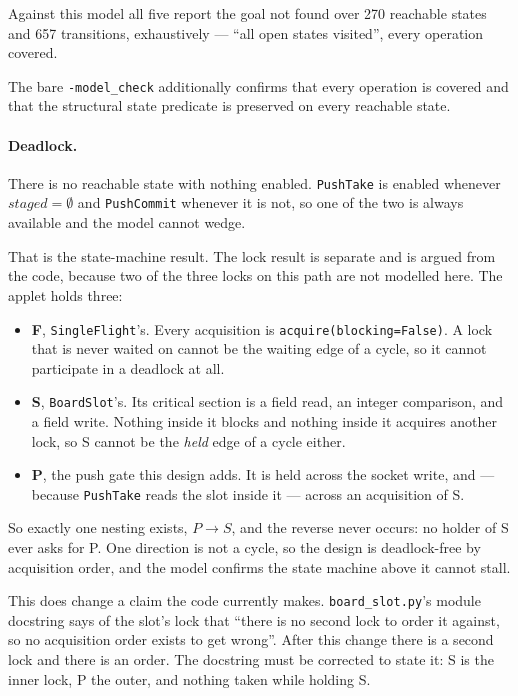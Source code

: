 \documentclass[a4paper,10pt,fleqn]{article}
\begin{document}
Against this model all five report the goal not found over 270 reachable states
and 657 transitions, exhaustively --- ``all open states visited'', every
operation covered.

The bare \texttt{-model\_check} additionally confirms that every operation is
covered and that the structural state predicate is preserved on every reachable
state.

\paragraph{Deadlock.}
There is no reachable state with nothing enabled. \texttt{PushTake} is enabled
whenever $staged = \emptyset$ and \texttt{PushCommit} whenever it is not, so one
of the two is always available and the model cannot wedge.

That is the state-machine result. The lock result is separate and is argued from
the code, because two of the three locks on this path are not modelled here. The
applet holds three:

\begin{itemize}
  \item \textbf{F}, \texttt{SingleFlight}'s. Every acquisition is
    \texttt{acquire(blocking=False)}. A lock that is never waited on cannot be
    the waiting edge of a cycle, so it cannot participate in a deadlock at all.
  \item \textbf{S}, \texttt{BoardSlot}'s. Its critical section is a field read,
    an integer comparison, and a field write. Nothing inside it blocks and
    nothing inside it acquires another lock, so S cannot be the \emph{held} edge
    of a cycle either.
  \item \textbf{P}, the push gate this design adds. It is held across the socket
    write, and --- because \texttt{PushTake} reads the slot inside it --- across
    an acquisition of S.
\end{itemize}

So exactly one nesting exists, $P \rightarrow S$, and the reverse never occurs:
no holder of S ever asks for P. One direction is not a cycle, so the design is
deadlock-free by acquisition order, and the model confirms the state machine
above it cannot stall.

This does change a claim the code currently makes. \texttt{board\_slot.py}'s
module docstring says of the slot's lock that ``there is no second lock to order
it against, so no acquisition order exists to get wrong''. After this change
there is a second lock and there is an order. The docstring must be corrected to
state it: S is the inner lock, P the outer, and nothing taken while holding S.
\end{document}
